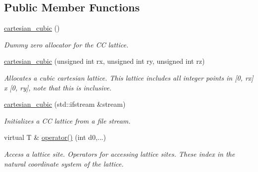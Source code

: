 \subsection*{Public Member Functions}
\begin{DoxyCompactItemize}
\item 
\mbox{\label{classsisl_1_1cartesian__cubic_aa8c27fad87e2d7a21533b8649434fd2a}} 
\hyperlink{classsisl_1_1cartesian__cubic_aa8c27fad87e2d7a21533b8649434fd2a}{cartesian\+\_\+cubic} ()
\begin{DoxyCompactList}\small\item\em Dummy zero allocator for the CC lattice. \end{DoxyCompactList}\item 
\mbox{\label{classsisl_1_1cartesian__cubic_a0dd7f488ca8c00be1eb1b51262534651}} 
\hyperlink{classsisl_1_1cartesian__cubic_a0dd7f488ca8c00be1eb1b51262534651}{cartesian\+\_\+cubic} (unsigned int rx, unsigned int ry, unsigned int rz)
\begin{DoxyCompactList}\small\item\em Allocates a cubic cartesian lattice. This lattice includes all integer points in \mbox{[}0, rx\mbox{]} x \mbox{[}0, ry\mbox{]}, note that this is inclusive. \end{DoxyCompactList}\item 
\mbox{\label{classsisl_1_1cartesian__cubic_a620b3d4bcd47b6e45e5ea01e41427bd5}} 
\hyperlink{classsisl_1_1cartesian__cubic_a620b3d4bcd47b6e45e5ea01e41427bd5}{cartesian\+\_\+cubic} (std\+::ifstream \&stream)
\begin{DoxyCompactList}\small\item\em Initializes a CC lattice from a file stream. \end{DoxyCompactList}\item 
\mbox{\label{classsisl_1_1cartesian__cubic_acabf6e0c838717d24ef7dea204d2aa6f}} 
virtual T \& \hyperlink{classsisl_1_1cartesian__cubic_acabf6e0c838717d24ef7dea204d2aa6f}{operator()} (int d0,...)
\begin{DoxyCompactList}\small\item\em Access a lattice site. Operators for accessing lattice sites. These index in the natural coordinate system of the lattice. \end{DoxyCompactList}\item 

\end{DoxyCompactItemize}
